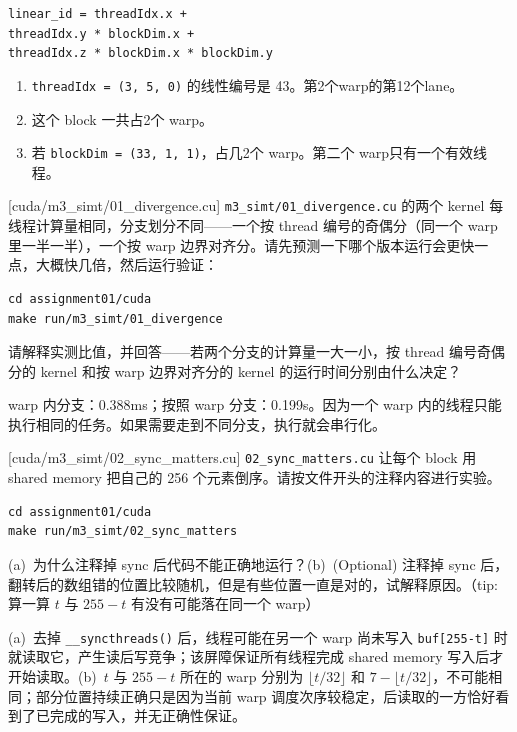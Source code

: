 \documentclass[11pt,a4paper,fontset=none]{ctexart}
\begin{document}
\texttt{linear\_id = threadIdx.x + \\
  threadIdx.y * blockDim.x + \\
  threadIdx.z * blockDim.x * blockDim.y
}

\begin{enumerate}[label=(\alph*)]
  \item \texttt{threadIdx = (3, 5, 0)} 的线性编号是 43。第2个warp的第12个lane。
  \item 这个 block 一共占2个 warp。
  \item 若 \texttt{blockDim = (33, 1, 1)}，占几2个 warp。第二个 warp只有一个有效线程。
\end{enumerate}

[cuda/m3\_simt/01\_divergence.cu]
\texttt{m3\_simt/01\_divergence.cu} 的两个 kernel 每线程计算量相同，分支划分不同——一个按 thread 编号的奇偶分（同一个 warp 里一半一半），一个按 warp 边界对齐分。请先预测一下哪个版本运行会更快一点，大概快几倍，然后运行验证：

\begin{lstlisting}
cd assignment01/cuda
make run/m3_simt/01_divergence
\end{lstlisting}

请解释实测比值，并回答——若两个分支的计算量一大一小，按 thread 编号奇偶分的 kernel 和按 warp 边界对齐分的 kernel 的运行时间分别由什么决定？

warp 内分支：0.388ms；按照 warp 分支：0.199s。因为一个 warp 内的线程只能执行相同的任务。如果需要走到不同分支，执行就会串行化。

[cuda/m3\_simt/02\_sync\_matters.cu]
\texttt{02\_sync\_matters.cu} 让每个 block 用 shared memory 把自己的 256 个元素倒序。请按文件开头的注释内容进行实验。

\begin{lstlisting}
cd assignment01/cuda
make run/m3_simt/02_sync_matters
\end{lstlisting}

(a)~为什么注释掉 sync 后代码不能正确地运行？(b)~(Optional) 注释掉 sync 后，翻转后的数组错的位置比较随机，但是有些位置一直是对的，试解释原因。（tip: 算一算 $t$ 与 $255-t$ 有没有可能落在同一个 warp）

(a)~去掉 \texttt{\_\_syncthreads()} 后，线程可能在另一个 warp 尚未写入 \texttt{buf[255-t]} 时就读取它，产生读后写竞争；该屏障保证所有线程完成 shared memory 写入后才开始读取。(b)~$t$ 与 $255-t$ 所在的 warp 分别为 $\lfloor t/32\rfloor$ 和 $7-\lfloor t/32\rfloor$，不可能相同；部分位置持续正确只是因为当前 warp 调度次序较稳定，后读取的一方恰好看到了已完成的写入，并无正确性保证。
\end{document}
